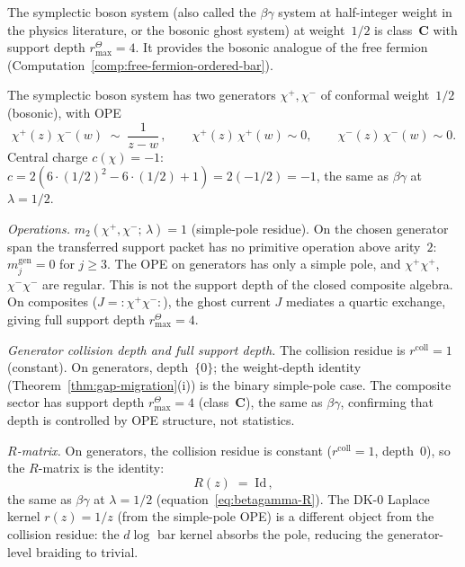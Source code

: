 The symplectic boson system (also called the $\beta\gamma$
system at half-integer weight in the physics literature,
or the bosonic ghost system) at weight~$1/2$ is
class~$\mathbf{C}$ with support depth $r^\Theta_{\max}=4$. It provides the
bosonic analogue of the free fermion
(Computation~\ref{comp:free-fermion-ordered-bar}).

\begin{computation}%
\label{comp:symplectic-boson-ordered-bar}%
%
%
%
The symplectic boson system has two generators
$\chi^+, \chi^-$ of conformal weight~$1/2$ (bosonic),
with OPE
\begin{equation}\label{eq:symplectic-boson-ope}
\chi^+(z)\,\chi^-(w) \;\sim\; \frac{1}{z-w}\,,
\qquad
\chi^+(z)\,\chi^+(w) \sim 0,
\qquad
\chi^-(z)\,\chi^-(w) \sim 0.
\end{equation}
Central charge $c(\chi) = -1$:
$c = 2(6 \cdot (1/2)^2 - 6 \cdot (1/2) + 1) = 2(-1/2) = -1$,
the same as $\beta\gamma$ at $\lambda = 1/2$.

\smallskip
\noindent
\emph{Operations.}
$m_2(\chi^+, \chi^-;\,\lambda) = 1$ (simple-pole residue).
On the chosen generator span the transferred support packet has no
primitive operation above arity~$2$:
$m^{\mathrm{gen}}_j=0$ for $j\ge3$. The OPE on generators has only a
simple pole, and $\chi^+\chi^+$, $\chi^-\chi^-$ are regular. This is
not the support depth of the closed composite algebra. On composites
($J = {:}\chi^+\chi^-{:}$), the ghost current $J$ mediates a quartic
exchange, giving full support depth $r^\Theta_{\max}=4$.

\smallskip
\noindent
\emph{Generator collision depth and full support depth.}
The collision residue is $r^{\mathrm{coll}} = 1$ (constant).
On generators, depth~$\{0\}$; the weight-depth identity
(Theorem~\ref{thm:gap-migration}(i)) is the binary simple-pole case.
The composite sector has support depth $r^\Theta_{\max}=4$
(class~$\mathbf{C}$), the same as
$\beta\gamma$, confirming that depth is controlled by
OPE structure, not statistics.

\smallskip
\noindent
\emph{$R$-matrix.}
On generators, the collision residue is constant
($r^{\mathrm{coll}} = 1$, depth~$0$), so the $R$-matrix is
the identity:
\begin{equation}\label{eq:symplectic-boson-R}
R(z) \;=\; \mathrm{Id}\,,
\end{equation}
the same as $\beta\gamma$ at $\lambda = 1/2$
(equation~\eqref{eq:betagamma-R}). The DK-0 Laplace
kernel $r(z) = 1/z$ (from the simple-pole OPE) is a
different object from the collision residue: the $d\log$
bar kernel absorbs the pole, reducing the generator-level
braiding to trivial.


\end{computation}
